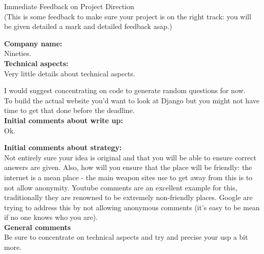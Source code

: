 \documentclass{article}
\begin{document}
\begin{center}
\Huge{Immediate Feedback on Project Direction}\\
\tiny{(This is some feedback to make sure your project is on the right track: you will be given detailed a mark and detailed feedback asap.)}
\end{center}


\normalsize
\textbf{Company name:}\\

Nineties. \\

\textbf{Technical aspects:}\\

Very little details about technical aspects.

I would suggest concentrating on code to generate random questions for now.\\

To build the actual website you'd want to look at Django but you might not have time to get that done before the deadline.\\

\textbf{Initial comments about write up:}\\

Ok.

\textbf{Initial comments about strategy:}\\

Not entirely sure your idea is original and that you will be able to ensure correct answers are given. Also, how will you ensure that the place will be friendly: the internet is a mean place - the main weapon sites use to get away from this is to not allow anonymity.
Youtube comments are an excellent example for this, traditionally they are renowned to be extremely non-friendly places. Google are trying to address this by not allowing anonymous comments (it's easy to be mean if no one knows who you are).  \\

\textbf{General comments}\\

Be sure to concentrate on technical aspects and try and precise your usp a bit more.
\end{document}
